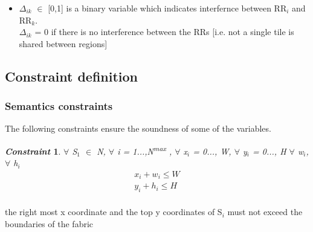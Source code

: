 \documentclass[conference]{IEEEtran}
\newtheorem{constraint}{\textit{Constraint}}
\newenvironment{defn}
{\vspace{12pt} \noindent {\textit{meaning:}}} \\
\begin{document}
\begin{itemize}
\item $\Delta_{ik}$ $\in$ [0,1] is a binary variable which indicates interfernce between RR$_i$ and RR$_k$.\\
$\Delta_{ik}$ = 0 if there is no interference between the RRs [i.e. not a single tile is shared between regions]


\end{itemize}

\hfill \break

\subsection{Constraint definition}

\hfill \break

\subsubsection{\textbf {Semantics constraints}}
The following constraints ensure the soundness of some of the variables.\\
\begin{constraint} $\forall$ S$_1$ $\in$ N, $\forall$ i = 1...,N\textsuperscript{max} , $\forall$ x$_i$ = 0..., W, $\forall$ y$_i$ = 0..., H $\forall$ w$_i$, $\forall$ h$_i$    
\begin{equation}
\begin{split}
x_i + w_i \leq W \\
y_i + h_i \leq H \\
\end{split}
\end{equation} 
\end{constraint}
\begin{defn} the right most x coordinate and the top y coordinates of S$_i$ must not exceed the boundaries of the fabric \\
\end{defn}
\end{document}
